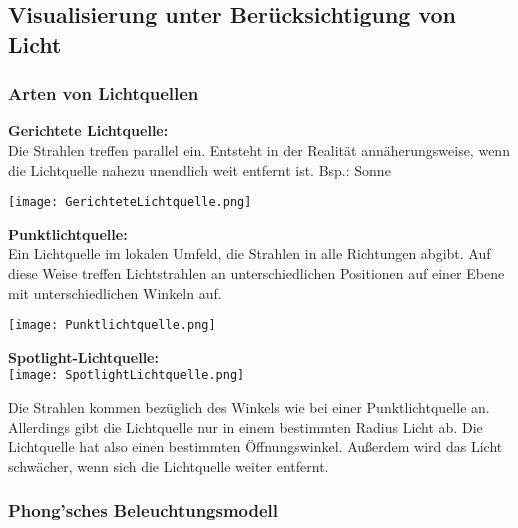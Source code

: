 \subsection{Visualisierung unter Berücksichtigung von Licht}
\subsubsection{Arten von Lichtquellen}
\textbf{Gerichtete Lichtquelle:}\\
Die Strahlen treffen parallel ein. Entsteht in der Realität annäherungsweise, wenn die Lichtquelle nahezu unendlich weit entfernt ist. Bsp.: Sonne

\texttt{[image: GerichteteLichtquelle.png]}

\vspace{5px}

\textbf{Punktlichtquelle:}\\
Ein Lichtquelle im lokalen Umfeld, die Strahlen in alle Richtungen abgibt. Auf diese Weise treffen Lichtstrahlen an unterschiedlichen Positionen auf einer Ebene mit unterschiedlichen Winkeln auf.

\texttt{[image: Punktlichtquelle.png]}

\vspace{5px}

\textbf{Spotlight-Lichtquelle:}\\

\texttt{[image: SpotlightLichtquelle.png]}

Die Strahlen kommen bezüglich des Winkels wie bei einer Punktlichtquelle an. Allerdings gibt die Lichtquelle nur in einem bestimmten Radius Licht ab. Die Lichtquelle hat also einen bestimmten Öffnungswinkel. Außerdem wird das Licht schwächer, wenn sich die Lichtquelle weiter entfernt.

\subsubsection{Phong'sches Beleuchtungsmodell}


